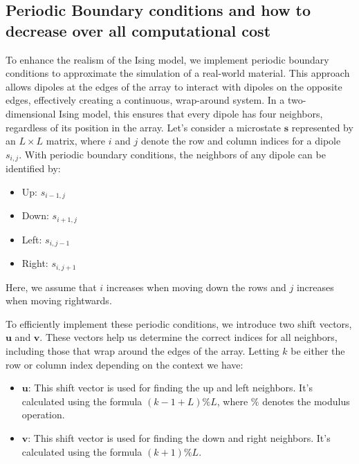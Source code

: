 \documentclass[../main_proj4_correct_template.tex]{subfiles}
\begin{document}
\subsection{Periodic Boundary conditions and how to decrease over all computational cost}

To enhance the realism of the Ising model, we implement periodic boundary conditions to approximate the simulation of a real-world material. This approach allows dipoles at the edges of the array to interact with dipoles on the opposite edges, effectively creating a continuous, wrap-around system. In a two-dimensional Ising model, this ensures that every dipole has four neighbors, regardless of its position in the array.
Let's consider a microstate $\mathbf{s}$ represented by an $L \times L$ matrix, where $i$ and $j$ denote the row and column indices for a dipole $s_{i,j}$. With periodic boundary conditions, the neighbors of any dipole can be identified by:

\noindent
\begin{varwidth}[t]{0.45\textwidth}
    \begin{itemize}
        \item Up: $s_{i-1, j}$
        \item Down: $s_{i+1, j}$
    \end{itemize}
\end{varwidth}%
\hspace{0.05\textwidth} %
\begin{varwidth}[t]{0.45\textwidth}
    \begin{itemize}
        \item Left: $s_{i, j-1}$
        \item Right: $s_{i, j+1}$
    \end{itemize}
\end{varwidth}

\noindent Here, we assume that $i$ increases when moving down the rows and $j$ increases when moving rightwards.

To efficiently implement these periodic conditions, we introduce two shift vectors, $\mathbf{u}$ and $\mathbf{v}$. These vectors help us determine the correct indices for all neighbors, including those that wrap around the edges of the array. Letting $k$ be either the row or column index depending on the context we have:
\begin{itemize}
    \item $\mathbf{u}$: This shift vector is used for finding the up and left neighbors. It's calculated using the formula $(k - 1 + L) \% L$, where $\%$ denotes the modulus operation.
    \item $\mathbf{v}$: This shift vector is used for finding the down and right neighbors. It's calculated using the formula $(k + 1) \% L$.
\end{itemize}
\end{document}
